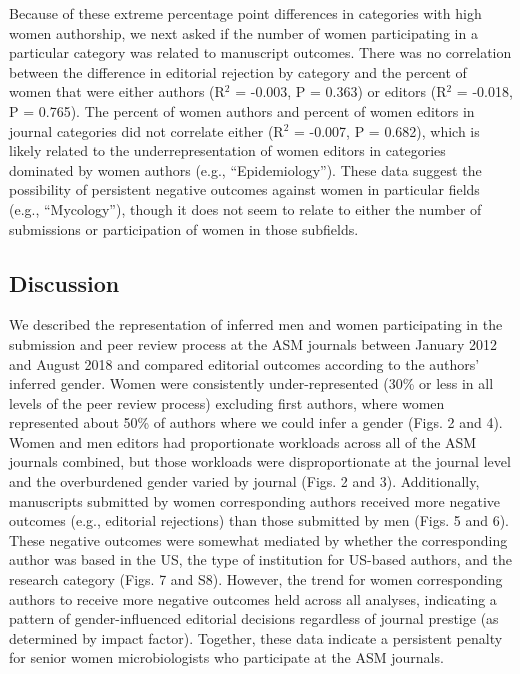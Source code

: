 \documentclass[11pt,]{article}
\begin{document}
Because of these extreme percentage point differences in categories with
high women authorship, we next asked if the number of women
participating in a particular category was related to manuscript
outcomes. There was no correlation between the difference in editorial
rejection by category and the percent of women that were either authors
(R\({^2}\) = -0.003, P = 0.363) or editors (R\({^2}\) = -0.018, P =
0.765). The percent of women authors and percent of women editors in
journal categories did not correlate either (R\({^2}\) = -0.007, P =
0.682), which is likely related to the underrepresentation of women
editors in categories dominated by women authors (e.g.,
``Epidemiology''). These data suggest the possibility of persistent
negative outcomes against women in particular fields (e.g.,
``Mycology''), though it does not seem to relate to either the number of
submissions or participation of women in those subfields.

\hypertarget{discussion}{%
\subsection{Discussion}\label{discussion}}

We described the representation of inferred men and women participating
in the submission and peer review process at the ASM journals between
January 2012 and August 2018 and compared editorial outcomes according
to the authors' inferred gender. Women were consistently
under-represented (30\% or less in all levels of the peer review
process) excluding first authors, where women represented about 50\% of
authors where we could infer a gender (Figs. 2 and 4). Women and men
editors had proportionate workloads across all of the ASM journals
combined, but those workloads were disproportionate at the journal level
and the overburdened gender varied by journal (Figs. 2 and 3).
Additionally, manuscripts submitted by women corresponding authors
received more negative outcomes (e.g., editorial rejections) than those
submitted by men (Figs. 5 and 6). These negative outcomes were somewhat
mediated by whether the corresponding author was based in the US, the
type of institution for US-based authors, and the research category
(Figs. 7 and S8). However, the trend for women corresponding authors to
receive more negative outcomes held across all analyses, indicating a
pattern of gender-influenced editorial decisions regardless of journal
prestige (as determined by impact factor). Together, these data indicate
a persistent penalty for senior women microbiologists who participate at
the ASM journals.
\end{document}
